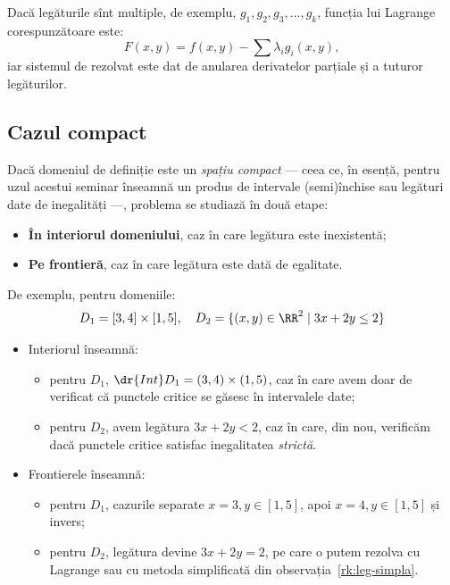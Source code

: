 \begin{remark}\label{rk:mm-leg}
  Dacă legăturile sînt multiple, de exemplu, $ g_1, g_2, g_3, \dots, g_k $,
  funcția lui Lagrange corespunzătoare este:
  \[
    F(x, y) = f(x, y) - \sum \lambda_i g_i(x, y),
  \]
  iar sistemul de rezolvat este dat de anularea derivatelor parțiale și
  a tuturor legăturilor.
\end{remark}


\subsection{Cazul compact}

Dacă domeniul de definiție este un \emph{spațiu compact} --- ceea ce, în esență,
pentru uzul acestui seminar înseamnă un produs de intervale (semi)închise
sau legături date de inegalități ---, problema se studiază în două etape:
\begin{itemize}
\item \textbf{În interiorul domeniului}, caz în care legătura este inexistentă;
\item \textbf{Pe frontieră}, caz în care legătura este dată de egalitate.
\end{itemize}

De exemplu, pentru domeniile:
\[
  D_1 = [3, 4] \times [1, 5], \quad D_2 = \{ (x, y) \in \RR^2 \mid 3x + 2y \leq 2 \}
\]
\begin{itemize}
\item Interiorul înseamnă:
  \begin{itemize}
  \item pentru $ D_1 $, $ \dr{Int}D_1 = (3, 4) \times (1, 5) $, caz în care avem
    doar de verificat că punctele critice se găsesc în intervalele date;
  \item pentru $ D_2 $, avem legătura $ 3x + 2y < 2 $, caz în care, din nou,
    verificăm dacă punctele critice satisfac inegalitatea \emph{strictă}.
  \end{itemize}
\item Frontierele înseamnă:
  \begin{itemize}
  \item pentru $ D_1 $, cazurile separate $ x = 3, y \in [1, 5] $, apoi
    $ x = 4, y \in [1, 5] $ și invers;
  \item pentru $ D_2 $, legătura devine $ 3x + 2y = 2 $, pe care o putem rezolva
    cu Lagrange sau cu metoda simplificată din observația~\ref{rk:leg-simpla}.
  \end{itemize}
\end{itemize}

